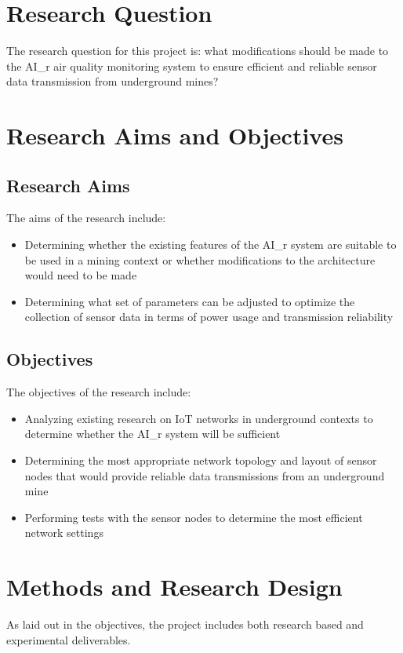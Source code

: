 \documentclass[a4paper,twoside,12pt]{report}
\begin{document}
\section{Research Question}
The research question for this project is: what modifications should be made to the AI\_r air quality monitoring system to ensure efficient and reliable sensor data transmission from underground mines?

\section{Research Aims and Objectives}

\subsection{Research Aims}
The aims of the research include:
\begin{itemize}
    \item Determining whether the existing features of the AI\_r system are suitable to be used in a mining context or whether modifications to the architecture would need to be made
    \item Determining what set of parameters can be adjusted to optimize the collection of sensor data in terms of power usage and transmission reliability
\end{itemize}

\subsection{Objectives}
The objectives of the research include:
\begin{itemize}
    \item Analyzing existing research on IoT networks in underground contexts to determine whether the AI\_r system will be sufficient
    \item Determining the most appropriate network topology and layout of sensor nodes that would provide reliable data transmissions from an underground mine
    \item Performing tests with the sensor nodes to determine the most efficient network settings
\end{itemize}

\section{Methods and Research Design}
As laid out in the objectives, the project includes both research based and experimental deliverables.
\end{document}
